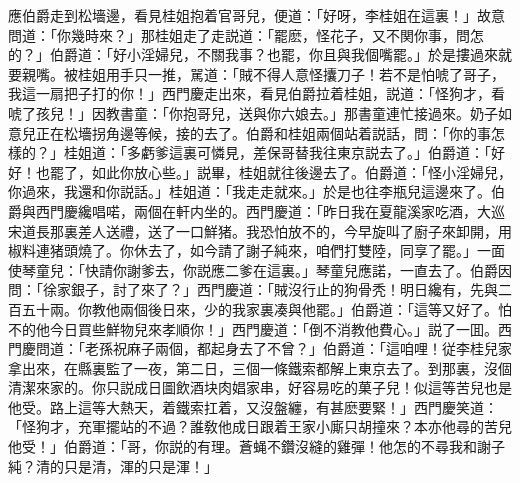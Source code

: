 應伯爵走到松墻邊，看見桂姐抱着官哥兒，便道：「好呀，李桂姐在這裏！」故意問道：「你幾時來？」那桂姐走了走説道：「罷麽，怪花子，又不関你事，問怎的？」伯爵道：「好小淫婦兒，不關我事？也罷，你且與我個嘴罷。」於是摟過來就要親嘴。被桂姐用手只一推，駡道：「賊不得人意怪攮刀子！若不是怕唬了哥子，我這一扇把子打的你！」西門慶走出來，看見伯爵拉着桂姐，説道：「怪狗才，看唬了孩兒！」因教書童：「你抱哥兒，送與你六娘去。」那書童連忙接過來。奶子如意兒正在松墻拐角邊等候，接的去了。伯爵和桂姐兩個站着説話，問：「你的事怎樣的？」桂姐道：「多虧爹這裏可憐見，差保哥替我往東京説去了。」伯爵道：「好好！也罷了，如此你放心些。」説畢，桂姐就往後邊去了。伯爵道：「怪小淫婦兒，你過來，我還和你説話。」桂姐道：「我走走就來。」於是也往李瓶兒這邊來了。伯爵與西門慶纔唱喏，兩個在軒内坐的。西門慶道：「昨日我在夏龍溪家吃酒，大巡宋道長那裏差人送禮，送了一口鮮猪。我恐怕放不的，今早旋叫了廚子來卸開，用椒料連猪頭燒了。你休去了，如今請了謝子純來，咱們打雙陸，同享了罷。」一面使琴童兒：「快請你謝爹去，你説應二爹在這裏。」琴童兒應諾，一直去了。伯爵因問：「徐家銀子，討了來了？」西門慶道：「賊沒行止的狗骨秃！明日纔有，先與二百五十兩。你教他兩個後日來，少的我家裏凑與他罷。」伯爵道：「這等又好了。怕不的他今日買些鮮物兒來孝順你！」西門慶道：「倒不消教他費心。」説了一囬。西門慶問道：「老孫祝麻子兩個，都起身去了不曾？」伯爵道：「這咱哩！従李桂兒家拿出來，在縣裏監了一夜，第二日，三個一條鐵索都解上東京去了。到那裏，沒個清潔來家的。你只説成日圖飲酒块肉娼家串，好容易吃的菓子兒！似這等苦兒也是他受。路上這等大熱天，着鐵索扛着，又沒盤纏，有甚麽要緊！」西門慶笑道：「怪狗才，充軍擺站的不過？誰敎他成日跟着王家小廝只胡撞來？本亦他尋的苦兒他受！」伯爵道：「哥，你説的有理。蒼蝇不鑽沒縫的雞彈！他怎的不尋我和謝子純？清的只是清，渾的只是渾！」

